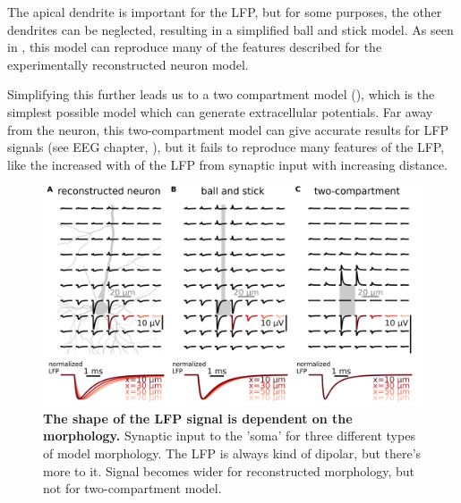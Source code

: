 The apical dendrite is important for the LFP, but for some purposes, the other dendrites can be neglected, resulting in a simplified ball and stick model. As seen in , this model can reproduce many of the features described for the experimentally reconstructed neuron model.

Simplifying this further leads us to a two compartment model  (),
which is the simplest possible model which can generate extracellular potentials.  
Far away from the neuron, this two-compartment model can give accurate results for LFP signals (see EEG chapter, ), but it fails to reproduce many features of the LFP,
like the increased with of the LFP from synaptic input with increasing distance.


\begin{figure}[!ht]
\begin{center}
\includegraphics[width=1.\textwidth]{Figures/LFP/compare_hay_bns_2comp.png}
\end{center}
\caption{\textbf{The shape of the LFP signal is dependent on the morphology.}
Synaptic input to the 'soma' for three different types of model morphology. The LFP is always kind of dipolar, but there's more to it. Signal becomes wider for reconstructed morphology, but not for two-compartment model.
}
\label{fig:LFP:morph_matters}
\end{figure}

\subsection{}



